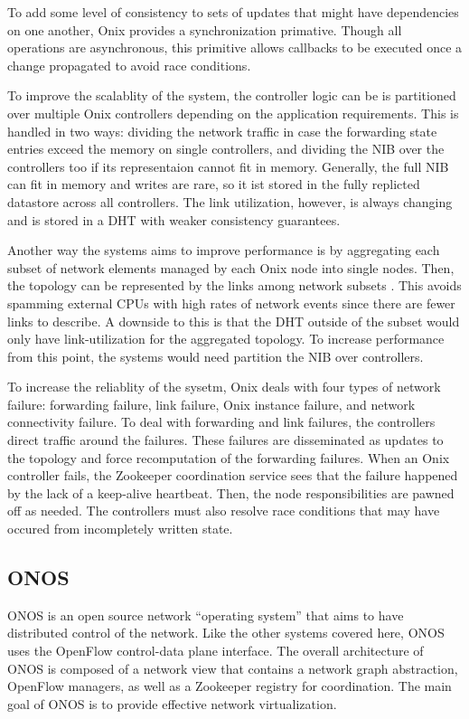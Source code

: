 \documentclass[letterpaper,twocolumn,10pt]{article}
\begin{document}
To add some level of consistency to sets of updates that might have dependencies on one another, Onix provides a synchronization primative. Though all operations are asynchronous, this primitive allows callbacks to be executed once a change propagated to avoid race conditions.

To improve the scalablity of the system, the controller logic can be is partitioned over multiple Onix controllers depending on the application requirements. This is handled in two ways: dividing the network traffic in case the forwarding state entries exceed the memory on single controllers, and dividing the NIB over the controllers too if its representaion cannot fit in memory. Generally, the full NIB can fit in memory and writes are rare, so it ist stored in the fully replicted datastore across all controllers. The link utilization, however, is always changing and is stored in a DHT with weaker consistency guarantees.

Another way the systems aims to improve performance is by aggregating each subset of network elements managed by each Onix node into single nodes. Then, the topology can be represented by the links among network subsets \cite{koponen2010onix}. This avoids spamming external CPUs with high rates of network events since there are fewer links to describe. A downside to this is that the DHT outside of the subset would only have link-utilization for the aggregated topology. To increase performance from this point, the systems would need partition the NIB over controllers.

To increase the reliablity of the sysetm, Onix deals with four types of network failure: forwarding failure, link failure, Onix instance failure, and network connectivity failure. To deal with forwarding and link failures, the controllers direct traffic around the failures. These failures are disseminated as updates to the topology and force recomputation of the forwarding failures. When an Onix controller fails, the Zookeeper coordination service sees that the failure happened by the lack of a keep-alive heartbeat. Then, the node responsibilities are pawned off as needed. The controllers must also resolve race conditions that may have occured from incompletely written state.
    
\subsection{ONOS}

ONOS is an open source network ``operating system'' that aims to have distributed control of the network. Like the other systems covered here, ONOS uses the OpenFlow control-data plane interface. The overall architecture of ONOS is composed of a network view that contains a network graph abstraction, OpenFlow managers, as well as a Zookeeper registry for coordination. The main goal of ONOS is to provide effective network virtualization.\cite{berde2014onos}
\end{document}
